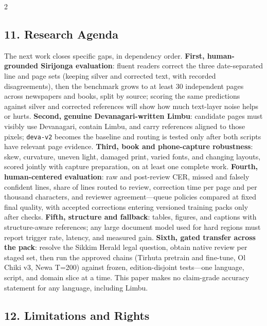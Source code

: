 \documentclass[
  10pt,
]{article}
\begin{document}
\begin{multicols}{2}
\subsection{11. Research Agenda}\label{research-agenda}

The next work closes specific gaps, in dependency order. \textbf{First,
human-grounded Sirijonga evaluation}: fluent readers correct the three
date-separated line and page sets (keeping silver and corrected text,
with recorded disagreements), then the benchmark grows to at least 30
independent pages across newspapers and books, split by source; scoring
the same predictions against silver and corrected references will show
how much text-layer noise helps or hurts. \textbf{Second, genuine
Devanagari-written Limbu}: candidate pages must visibly use Devanagari,
contain Limbu, and carry references aligned to those pixels;
\texttt{deva-v2} becomes the baseline and routing is tested only after
both scripts have relevant page evidence. \textbf{Third, book and
phone-capture robustness}: skew, curvature, uneven light, damaged print,
varied fonts, and changing layouts, scored jointly with capture
preparation, on at least one complete work. \textbf{Fourth,
human-centered evaluation}: raw and post-review CER, missed and falsely
confident lines, share of lines routed to review, correction time per
page and per thousand characters, and reviewer agreement---queue
policies compared at fixed final quality, with accepted corrections
entering versioned training packs only after checks. \textbf{Fifth,
structure and fallback}: tables, figures, and captions with
structure-aware references; any large document model used for hard
regions must report trigger rate, latency, and measured gain.
\textbf{Sixth, gated transfer across the pack}: resolve the Sikkim
Herald legal question, obtain native review per staged set, then run the
approved chains (Tirhuta pretrain and fine-tune, Ol Chiki v3, Newa
T=200) against frozen, edition-disjoint tests---one language, script,
and domain slice at a time. This paper makes no claim-grade accuracy
statement for any language, including Limbu.

\subsection{12. Limitations and Rights}\label{limitations-and-rights}


\end{multicols}
\end{document}
